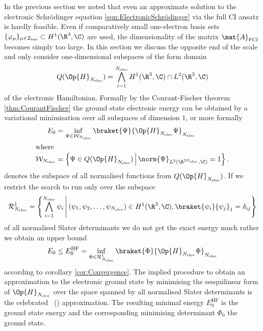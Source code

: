 In the previous section we noted that even an approximate
solution to the electronic Schrödinger equation \eqref{eqn:ElectronicSchrödinger}
via the full CI ansatz
is hardly feasible.
Even if comparatively small one-electron basis sets
$\{ \varphi_\mu \}_{\mu\in\Ibas} \subset H^1(\R^3,\C)$
are used,
the dimensionality
of the matrix $\mat{A}_\text{FCI}$ becomes simply too large.
In this section we discuss the opposite end of the scale and
only consider one-dimensional subspaces of the form domain
\[ Q(\Op{H}_{\Nelec}) = \bigwedge_{i=1}^{\Nelec} H^1(\R^3, \C) \cap L^2(\R^3, \C) \]
of the electronic Hamiltonian.
Formally by the Courant-Fischer theorem \eqref{thm:CourantFischer}
the ground state electronic energy can be obtained by
a variational minimisation over all subspaces of dimension $1$,
or more formally
\begin{align}
	\label{eqn:GroundStateVariational}
	E_0 &= \inf_{\Psi \in \mathcal{W}_{\Nelec}} \braket{\Psi}{\Op{H}_{\Nelec} \Psi}_{\Nelec} \\
\intertext{where}
	\label{eqn:NormalisedFormDomain}
	\mathcal{W}_{\Nelec} &= \left\{ \Psi \in Q(\Op{H}_{\Nelec})
	\, \middle| \,
	\norm{\Psi}_{L^2(\R^{3 \Nelec}, \C)} = 1 \right\}.
\end{align}
denotes the subspace of all normalised functions from $Q(\Op{H}_{\Nelec})$.
If we restrict the search to run only over the subspace
\begin{equation}
	\mathcal{R}^1_{\Nelec} = \left\{ \bigwedge_{i=1}^{\Nelec} \psi_i
	\, \middle| \,
	\left( \psi_1, \psi_2, \ldots, \psi_{\Nelec} \right) \in H^1(\R^3, \C),
	\braket{\psi_i}{\psi_j}_1 = \delta_{ij}
	\right\}
	\label{eqn:RankOneSubspace}
\end{equation}
of all normalised Slater determinants we do not get the exact
energy much rather we obtain an upper bound
\begin{equation}
	E_0 \leq E_0^\text{HF} = \inf_{\Phi \in \mathcal{R}^1_{\Nelec}}
	\braket{\Phi}{\Op{H}_{\Nelec} \Phi}_{\Nelec}
	\label{eqn:HFDeterminant}
\end{equation}
according to corollary \vref{cor:Convergence}.
The implied procedure
to obtain an approximation to the electronic ground state
by minimising the sesquilinear form of $\Op{H}_{\Nelec}$
over the space spanned by all normalised Slater determinants
is the celebrated ~(\HF) approximation.
The resulting minimal energy $E_0^\text{HF}$
is the \HF ground state energy
and the corresponding minimising determinant
$\Phi_0$ the \HF ground state.

